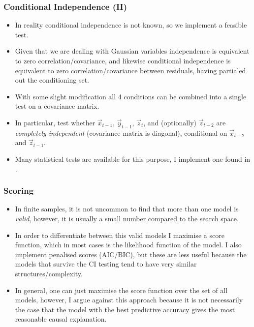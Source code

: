 \documentclass{beamer}
\begin{document}
\begin{frame}
    \frametitle{Conditional Independence (II)}
    \begin{itemize}
        \item In reality conditional independence is not known, so we implement a feasible test.
        \item Given that we are dealing with Gaussian variables independence is equivalent to zero correlation/covariance, and likewise conditional independence is equivalent to zero correlation/covariance between residuals, having partialed out the conditioning set.
        \item With some slight modification all 4 conditions can be combined into a single test on a covariance matrix.
        \item In particular, test whether $\vec{x}_{t-1}$, $\vec{y}_{t-1}$, $\vec{z}_{t}$, and (optionally) $\vec{z}_{t-2}$ are \textit{completely independent} (covariance matrix is diagonal), conditional on $\vec{x}_{t-2}$ and $\vec{z}_{t-1}$.
        \item Many statistical tests are available for this purpose, I implement one found in \parencite{srivastava2005some}.
    \end{itemize}
\end{frame}

\begin{frame}
    \frametitle{Scoring}
    \begin{itemize}
        \item In finite samples, it is not uncommon to find that more than one model is \textit{valid}, however, it is usually a small number compared to the search space.
        \item In order to differentiate between this valid models I maximise a score function, which in most cases is the likelihood function of the model. I also implement penalised scores (AIC/BIC), but these are less useful because the models that survive the CI testing tend to have very similar structures/complexity.
        \item In general, one can just maximise the score function over the set of all models, however, I argue against this approach because it is not necessarily the case that the model with the best predictive accuracy gives the most reasonable causal explanation.
    \end{itemize}
\end{frame}
\end{document}
